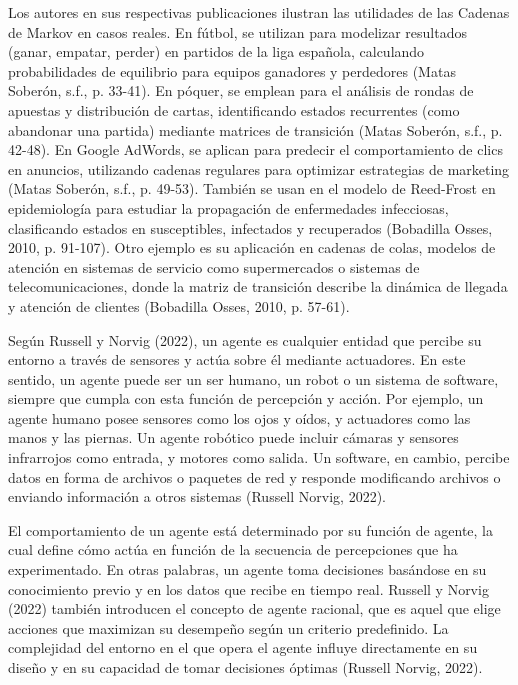 Los autores en sus respectivas publicaciones ilustran las utilidades de las Cadenas de Markov en casos reales. En fútbol, se utilizan para modelizar resultados (ganar, empatar, perder) en partidos de la liga española, calculando probabilidades de equilibrio para equipos ganadores y perdedores (Matas Soberón, s.f., p. 33-41). En póquer, se emplean para el análisis de rondas de apuestas y distribución de cartas, identificando estados recurrentes (como abandonar una partida) mediante matrices de transición (Matas Soberón, s.f., p. 42-48). En Google AdWords, se aplican para predecir el comportamiento de clics en anuncios, utilizando cadenas regulares para optimizar estrategias de marketing (Matas Soberón, s.f., p. 49-53). También se usan en el modelo de Reed-Frost en epidemiología para estudiar la propagación de enfermedades infecciosas, clasificando estados en susceptibles, infectados y recuperados (Bobadilla Osses, 2010, p. 91-107). Otro ejemplo es su aplicación en cadenas de colas, modelos de atención en sistemas de servicio como supermercados o sistemas de telecomunicaciones, donde la matriz de transición describe la dinámica de llegada y atención de clientes (Bobadilla Osses, 2010, p. 57-61).


Según Russell y Norvig (2022), un agente es cualquier entidad que percibe su entorno a través de sensores y actúa sobre él mediante actuadores. En este sentido, un agente puede ser un ser humano, un robot o un sistema de software, siempre que cumpla con esta función de percepción y acción. Por ejemplo, un agente humano posee sensores como los ojos y oídos, y actuadores como las manos y las piernas. Un agente robótico puede incluir cámaras y sensores infrarrojos como entrada, y motores como salida. Un software, en cambio, percibe datos en forma de archivos o paquetes de red y responde modificando archivos o enviando información a otros sistemas (Russell Norvig, 2022).

El comportamiento de un agente está determinado por su función de agente, la cual define cómo actúa en función de la secuencia de percepciones que ha experimentado. En otras palabras, un agente toma decisiones basándose en su conocimiento previo y en los datos que recibe en tiempo real. Russell y Norvig (2022) también introducen el concepto de agente racional, que es aquel que elige acciones que maximizan su desempeño según un criterio predefinido. La complejidad del entorno en el que opera el agente influye directamente en su diseño y en su capacidad de tomar decisiones óptimas (Russell Norvig, 2022).

